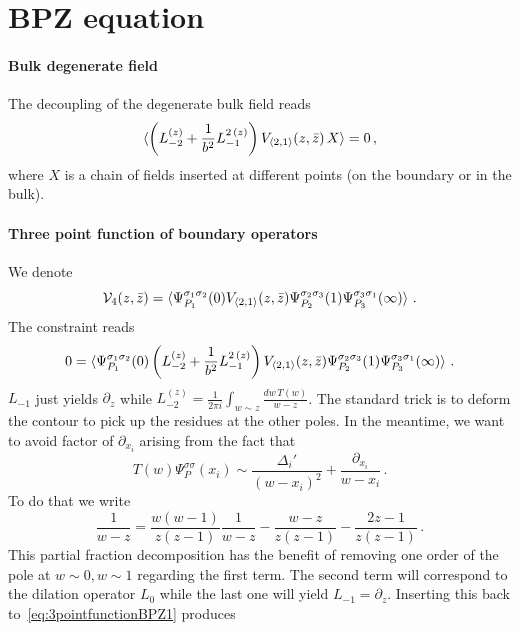 \documentclass[a4paper]{article}
\begin{document}
\section{BPZ equation}
\paragraph{Bulk degenerate field}
The decoupling of the degenerate bulk field reads 
\begin{equation}
  \braket{\left(L_{-2}^{(z)}+\frac{1}{b^2}L_{-1}^{2\,(z)}\right)V_{\braket{2,1}}(z,\bar{z})\,X} = 0\,,
\end{equation}
where $X$ is a chain of fields inserted at different points (on the boundary or in the bulk).
\paragraph{Three point function of boundary operators}
We denote
\begin{equation}
  \mathcal{V}_{4}(z,\bar{z})=\braket{\Psi_{P_1}^{\sigma_1 \sigma_2}(0)V_{\braket{2,1}}(z,\bar{z})\Psi_{P_2}^{\sigma_2 \sigma_3}(1)\Psi_{P_3}^{\sigma_3 \sigma_1}(\infty)}\,.
\end{equation}
The constraint reads
\begin{equation}\label{eq:3pointfunctionBPZ1}
  0=\braket{\Psi_{P_1}^{\sigma_1 \sigma_2}(0)\left(L_{-2}^{(z)}+\frac{1}{b^2}L_{-1}^{2\,(z)}\right)V_{\braket{2,1}}(z,\bar{z})\Psi_{P_2}^{\sigma_2 \sigma_3}(1)\Psi_{P_3}^{\sigma_3 \sigma_1}(\infty)}\,.
\end{equation}
$L_{-1}$ just yields $\partial_z$ while $L_{-2}^{(z)}=\frac{1}{2\pi i}\int_{w \sim z}\frac{dw\,T(w)}{w-z}$. The standard trick is to deform the contour to pick up the residues at the other poles. In the meantime, we want to avoid factor of $\partial_{x_i}$ arising from the fact that 
\begin{equation}
  T(w)\Psi_{P}^{\sigma \sigma}(x_i)\sim \frac{\Delta_i'}{(w-x_{i})^2}+\frac{\partial_{x_{i}}}{w-x_{i}}\,.
\end{equation}
To do that we write
\begin{equation}
  \frac{1}{w-z}=\frac{w(w-1)}{z(z-1)}\frac{1}{w-z}-\frac{w-z}{z(z-1)}-\frac{2z-1}{z(z-1)}\,.
\end{equation}
This partial fraction decomposition has the benefit of removing one order of the pole at $w\sim0,w\sim1$ regarding the first term. The second term will correspond to the dilation operator $L_0$ while the last one will yield $L_{-1}=\partial_z$. Inserting this back to~\eqref{eq:3pointfunctionBPZ1} produces
\end{document}
